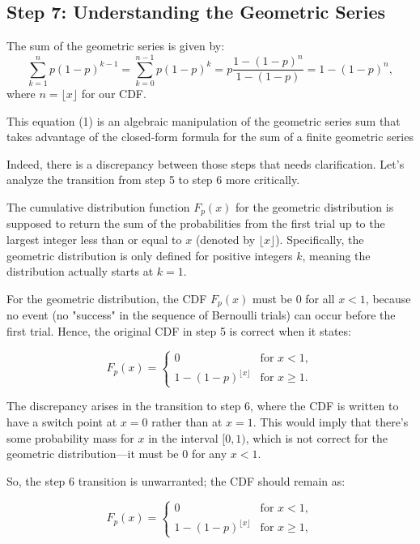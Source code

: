 \documentclass[12pt]{article}
\begin{document}
\subsection*{Step 7: Understanding the Geometric Series}

The sum of the geometric series is given by:
\[
\sum _{k=1}^n p(1-p)^{k-1} = \sum _{k=0}^{n-1} p(1-p)^{k} = p \frac{1 - (1-p)^n}{1-(1-p)} = 1 - (1-p)^n,
\]
where \( n = \lfloor x \rfloor \) for our CDF.

This equation (1) is an algebraic manipulation of the geometric series sum that takes advantage of the closed-form formula for the sum of a finite geometric series


\newpage

Indeed, there is a discrepancy between those steps that needs clarification. Let's analyze the transition from step 5 to step 6 more critically.

The cumulative distribution function \( F_p(x) \) for the geometric distribution is supposed to return the sum of the probabilities from the first trial up to the largest integer less than or equal to \( x \) (denoted by \( \lfloor x \rfloor \)). Specifically, the geometric distribution is only defined for positive integers \( k \), meaning the distribution actually starts at \( k = 1 \).

For the geometric distribution, the CDF \( F_{p}(x) \) must be 0 for all \( x < 1 \), because no event (no "success" in the sequence of Bernoulli trials) can occur before the first trial. Hence, the original CDF in step 5 is correct when it states:

\[
F_p(x) = 
\begin{cases}
0 & \text{for } x < 1, \\
1 - (1 - p)^{\lfloor x \rfloor} & \text{for } x \geq 1.
\end{cases}
\]

The discrepancy arises in the transition to step 6, where the CDF is written to have a switch point at \( x = 0 \) rather than at \( x = 1 \). This would imply that there's some probability mass for \( x \) in the interval \( [0, 1) \), which is not correct for the geometric distribution—it must be 0 for any \( x < 1 \).

So, the step 6 transition is unwarranted; the CDF should remain as:

\[
F_p(x) = 
\begin{cases}
0 & \text{for } x < 1, \\
1 - (1 - p)^{\lfloor x \rfloor} & \text{for } x \geq 1,
\end{cases}
\]
\end{document}
